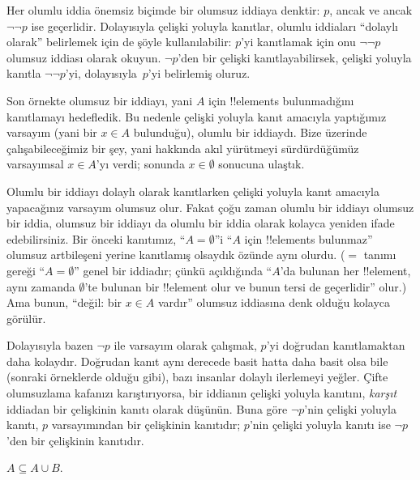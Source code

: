 Her olumlu iddia önemsiz biçimde bir olumsuz iddiaya denktir: $p$, ancak
ve ancak $\lnot\lnot p$ ise geçerlidir. Dolayısıyla çelişki yoluyla
kanıtlar, olumlu iddiaları ``dolaylı olarak'' belirlemek için de şöyle
kullanılabilir: $p$'yi kanıtlamak için onu $\lnot\lnot p$ olumsuz
iddiası olarak okuyun. $\lnot p$'den bir çelişki kanıtlayabilirsek,
çelişki yoluyla kanıtla $\lnot\lnot p$'yi, dolayısıyla~$p$'yi belirlemiş
oluruz.

Son örnekte olumsuz bir iddiayı, yani $A$ için !!{element}s
bulunmadığını kanıtlamayı hedefledik. Bu nedenle çelişki yoluyla kanıt
amacıyla yaptığımız varsayım (yani bir $x \in A$ bulunduğu), olumlu bir
iddiaydı. Bize üzerinde çalışabileceğimiz bir şey, yani hakkında akıl
yürütmeyi sürdürdüğümüz varsayımsal $x \in A$'yı verdi; sonunda $x \in
\emptyset$ sonucuna ulaştık.

Olumlu bir iddiayı dolaylı olarak kanıtlarken çelişki yoluyla kanıt
amacıyla yapacağınız varsayım olumsuz olur. Fakat çoğu zaman olumlu bir
  iddiayı olumsuz bir iddia, olumsuz bir iddiayı da olumlu bir iddia
  olarak kolayca yeniden ifade edebilirsiniz. Bir önceki kanıtımız,
  ``$A = \emptyset$''i ``$A$ için !!{element}s bulunmaz'' olumsuz
  artbileşeni yerine kanıtlamış olsaydık özünde aynı olurdu. ($=$ tanımı gereği
``$A = \emptyset$'' genel bir iddiadır; çünkü açıldığında ``$A$'da
bulunan her !!{element}, aynı zamanda $\emptyset$'te bulunan bir
!!{element} olur ve bunun tersi de geçerlidir'' olur.) Ama bunun,
``değil: bir $x \in A$ vardır'' olumsuz
iddiasına denk olduğu kolayca görülür.

Dolayısıyla bazen $\lnot p$ ile varsayım olarak çalışmak, $p$'yi
doğrudan kanıtlamaktan daha kolaydır. Doğrudan kanıt aynı derecede basit
hatta daha basit olsa bile (sonraki örneklerde olduğu gibi), bazı
insanlar dolaylı ilerlemeyi yeğler. Çifte olumsuzlama kafanızı
karıştırıyorsa, bir iddianın çelişki yoluyla kanıtını, \emph{karşıt}
iddiadan bir çelişkinin kanıtı olarak düşünün. Buna göre $\lnot p$'nin
çelişki yoluyla kanıtı, $p$ varsayımından bir çelişkinin kanıtıdır;
$p$'nin çelişki yoluyla kanıtı ise $\lnot p$'den bir çelişkinin
kanıtıdır.

\begin{prop}
$A \subseteq A \cup B$.
\end{prop}

